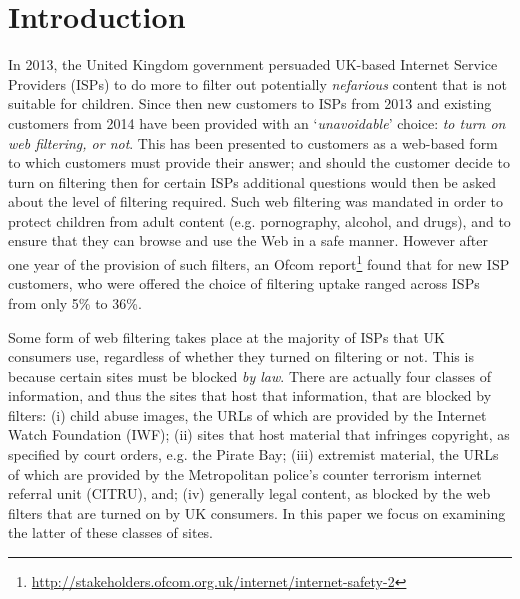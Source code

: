 \documentclass{bmcart}
\begin{document}

\section*{Introduction}


In 2013, the United Kingdom government persuaded UK-based Internet Service Providers (ISPs) to do more to filter out potentially \emph{nefarious} content that is not suitable for children.
Since then new customers to ISPs from 2013 and existing customers from 2014 have been provided with an `\textit{unavoidable}' choice: \textit{to turn on web filtering, or not}. 
This has been presented to customers as a web-based form to which customers must provide their answer; and should the customer decide to turn on filtering then for certain ISPs additional questions would then be asked about the level of filtering required.
Such web filtering was mandated in order to protect children from adult content (e.g. pornography, alcohol, and drugs), and to ensure that they can browse and use the Web in a safe manner.
However after one year of the provision of such filters, an Ofcom report\footnote{\url{http://stakeholders.ofcom.org.uk/internet/internet-safety-2}} found that for new ISP customers, who were offered the choice of filtering uptake ranged across ISPs from only 5\% to 36\%.

Some form of web filtering takes place at the majority of ISPs that UK consumers use, regardless of whether they turned on filtering or not.
This is because certain sites must be blocked \emph{by law}.
There are actually four classes of information, and thus the sites that host that information, that are blocked by filters: (i) child abuse images, the URLs of which are provided by the Internet Watch Foundation (IWF); (ii) sites that host material that infringes copyright, as specified by court orders, e.g. the Pirate Bay; (iii) extremist material, the URLs of which are provided by the Metropolitan police's counter terrorism internet referral unit (CITRU), and; (iv) generally legal content, as blocked by the web filters that are turned on by UK consumers.
In this paper we focus on examining the latter of these classes of sites.
\end{document}
